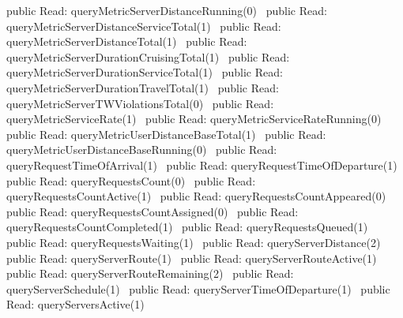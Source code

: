 public \LA{}Read: queryMetricServerDistanceRunning(0)~{\nwtagstyle{}}\RA{}
public \LA{}Read: queryMetricServerDistanceServiceTotal(1)~{\nwtagstyle{}}\RA{}
public \LA{}Read: queryMetricServerDistanceTotal(1)~{\nwtagstyle{}}\RA{}
public \LA{}Read: queryMetricServerDurationCruisingTotal(1)~{\nwtagstyle{}}\RA{}
public \LA{}Read: queryMetricServerDurationServiceTotal(1)~{\nwtagstyle{}}\RA{}
public \LA{}Read: queryMetricServerDurationTravelTotal(1)~{\nwtagstyle{}}\RA{}
public \LA{}Read: queryMetricServerTWViolationsTotal(0)~{\nwtagstyle{}}\RA{}
public \LA{}Read: queryMetricServiceRate(1)~{\nwtagstyle{}}\RA{}
public \LA{}Read: queryMetricServiceRateRunning(0)~{\nwtagstyle{}}\RA{}
public \LA{}Read: queryMetricUserDistanceBaseTotal(1)~{\nwtagstyle{}}\RA{}
public \LA{}Read: queryMetricUserDistanceBaseRunning(0)~{\nwtagstyle{}}\RA{}
public \LA{}Read: queryRequestTimeOfArrival(1)~{\nwtagstyle{}}\RA{}
public \LA{}Read: queryRequestTimeOfDeparture(1)~{\nwtagstyle{}}\RA{}
public \LA{}Read: queryRequestsCount(0)~{\nwtagstyle{}}\RA{}
public \LA{}Read: queryRequestsCountActive(1)~{\nwtagstyle{}}\RA{}
public \LA{}Read: queryRequestsCountAppeared(0)~{\nwtagstyle{}}\RA{}
public \LA{}Read: queryRequestsCountAssigned(0)~{\nwtagstyle{}}\RA{}
public \LA{}Read: queryRequestsCountCompleted(1)~{\nwtagstyle{}}\RA{}
public \LA{}Read: queryRequestsQueued(1)~{\nwtagstyle{}}\RA{}
public \LA{}Read: queryRequestsWaiting(1)~{\nwtagstyle{}}\RA{}
public \LA{}Read: queryServerDistance(2)~{\nwtagstyle{}}\RA{}
public \LA{}Read: queryServerRoute(1)~{\nwtagstyle{}}\RA{}
public \LA{}Read: queryServerRouteActive(1)~{\nwtagstyle{}}\RA{}
public \LA{}Read: queryServerRouteRemaining(2)~{\nwtagstyle{}}\RA{}
public \LA{}Read: queryServerSchedule(1)~{\nwtagstyle{}}\RA{}
public \LA{}Read: queryServerTimeOfDeparture(1)~{\nwtagstyle{}}\RA{}
public \LA{}Read: queryServersActive(1)~{\nwtagstyle{}}\RA{}
